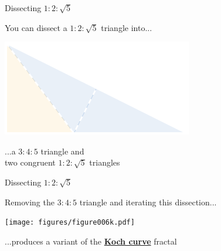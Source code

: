 \documentclass[14pt]{beamer}
\begin{document}
    \begin{frame}{Dissecting $1\!\!:\!\!2\!\!:\!\!\sqrt{5}$}
        \begin{center}
            You can dissect a $1\!\!:\!\!2\!\!:\!\!\sqrt{5}$ triangle into...

            \bigskip \bigskip

            \includegraphics[height=18ex]{figures/figure006e.pdf}

            \bigskip \bigskip

            ...a $3\!\!:\!\!4\!\!:\!\!5$ triangle and\\two congruent $1\!\!:\!\!2\!\!:\!\!\sqrt{5}$ triangles
        \end{center}
    \end{frame}


    \begin{frame}{Dissecting $1\!\!:\!\!2\!\!:\!\!\sqrt{5}$}
        \begin{center}
            Removing the $3\!\!:\!\!4\!\!:\!\!5$ triangle and iterating this dissection...

            \bigskip \bigskip

            \texttt{[image: figures/figure006k.pdf]}

            \bigskip \bigskip

            ...produces a variant of the \textbf{\href{https://en.wikipedia.org/wiki/Koch_snowflake}{Koch curve}} fractal\\[4ex]

        \end{center}
    \end{frame}

\end{document}
